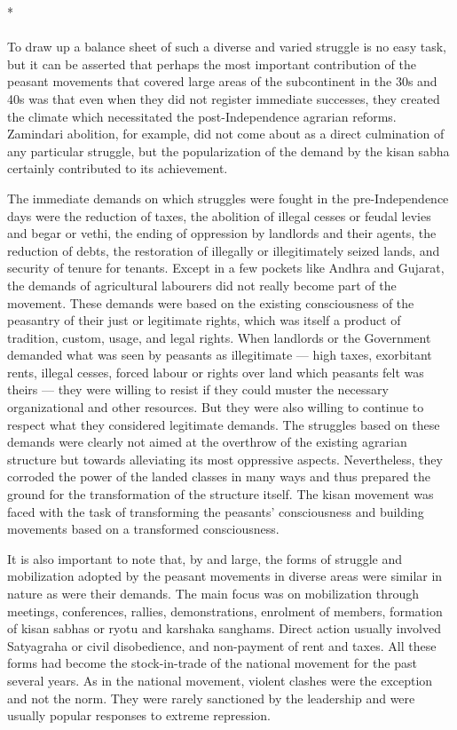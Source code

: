 \begin{multicols}{2}
\begin{center}*\end{center}

\paragraph*{}

To draw up a balance sheet of such a diverse and varied struggle is no easy task, but it can be asserted that perhaps the most important contribution of the peasant movements that covered large areas of the subcontinent in the 30s and 40s was that even when they did not register immediate successes, they created the climate which necessitated the post-Independence agrarian reforms. Zamindari abolition, for example, did not come about as a direct culmination of any particular struggle, but the popularization of the demand by the kisan sabha certainly contributed to its achievement.

The immediate demands on which struggles were fought in the pre-Independence days were the reduction of taxes, the abolition of illegal cesses or feudal levies and begar or vethi, the ending of oppression by landlords and their agents, the reduction of debts, the restoration of illegally or illegitimately seized lands, and security of tenure for tenants. Except in a few pockets like Andhra and Gujarat, the demands of agricultural labourers did not really become part of the movement. These demands were based on the existing consciousness of the peasantry of their just or legitimate rights, which was itself a product of tradition, custom, usage, and legal rights. When landlords or the Government demanded what was seen by peasants as illegitimate --- high taxes, exorbitant rents, illegal cesses, forced labour or rights over land which peasants felt was theirs --- they were willing to resist if they could muster the necessary organizational and other resources. But they were also willing to continue to respect what they considered legitimate demands. The struggles based on these demands were clearly not aimed at the overthrow of the existing agrarian structure but towards alleviating its most oppressive aspects. Nevertheless, they corroded the power of the landed classes in many ways and thus prepared the ground for the transformation of the structure itself. The kisan movement was faced with the task of transforming the peasants' consciousness and building movements based on a transformed consciousness.

It is also important to note that, by and large, the forms of struggle and mobilization adopted by the peasant movements in diverse areas were similar in nature as were their demands. The main focus was on mobilization through meetings, conferences, rallies, demonstrations, enrolment of members, formation of kisan sabhas or ryotu and karshaka sanghams. Direct action usually involved Satyagraha or civil disobedience, and non-payment of rent and taxes. All these forms had become the stock-in-trade of the national movement for the past several years. As in the national movement, violent clashes were the exception and not the norm. They were rarely sanctioned by the leadership and were usually popular responses to extreme repression.


\end{multicols}
